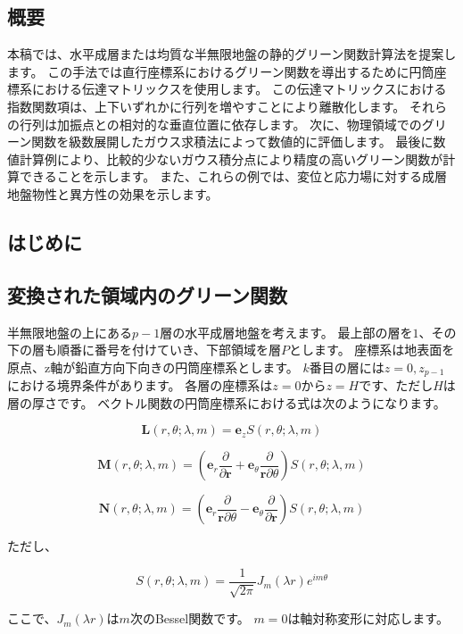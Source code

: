 \subsection{概要}

本稿では、水平成層または均質な半無限地盤の静的グリーン関数計算法を提案します。
この手法では直行座標系におけるグリーン関数を導出するために円筒座標系における伝達マトリックスを使用します。
この伝達マトリックスにおける指数関数項は、上下いずれかに行列を増やすことにより離散化します。
それらの行列は加振点との相対的な垂直位置に依存します。
次に、物理領域でのグリーン関数を級数展開したガウス求積法によって数値的に評価します。
最後に数値計算例により、比較的少ないガウス積分点により精度の高いグリーン関数が計算できることを示します。
また、これらの例では、変位と応力場に対する成層地盤物性と異方性の効果を示します。

\subsection{はじめに}

\subsection{変換された領域内のグリーン関数}

半無限地盤の上にある$p-1$層の水平成層地盤を考えます。
最上部の層を$1$、その下の層も順番に番号を付けていき、下部領域を層$P$とします。
座標系は地表面を原点、z軸が鉛直方向下向きの円筒座標系とします。
$k$番目の層には$z=0,z_{p-1}$における境界条件があります。
各層の座標系は$z=0$から$z=H$です、ただし$H$は層の厚さです。
ベクトル関数の円筒座標系における式は次のようになります。

\[\mathbf{L}\left(r,\theta;\lambda,m\right)=\mathbf{e}_{z}S\left(r,\theta;\lambda,m\right)\]

\[\mathbf{M}\left(r,\theta;\lambda,m\right)=\left(\mathbf{e}_{r}\dfrac{\partial}{\partial\mathbf{r}}+\mathbf{e}_{\theta}\dfrac{\partial}{\mathbf{r}\partial\theta}\right)S\left(r,\theta;\lambda,m\right)\]

\[\mathbf{N}\left(r,\theta;\lambda,m\right)=\left(\mathbf{e}_{r}\dfrac{\partial}{\mathbf{r}\partial\theta}-\mathbf{e}_{\theta}\dfrac{\partial}{\partial\mathbf{r}}\right)S\left(r,\theta;\lambda,m\right)\]

ただし、

\[S\left(r,\theta;\lambda,m\right)=\dfrac{1}{\sqrt{2\pi}}J_{m}\left(\lambda r\right)e^{im\theta}\]

ここで、$J_m(\lambda r)$は$m$次のBessel関数です。
$m=0$は軸対称変形に対応します。

